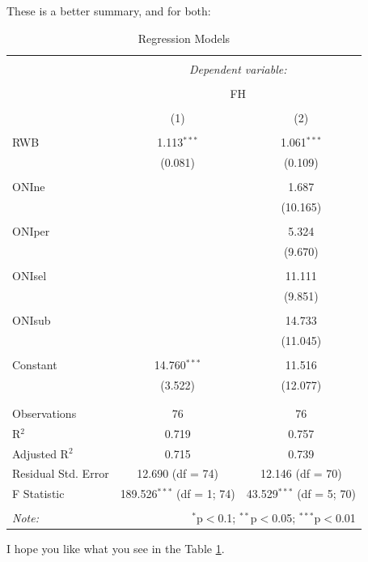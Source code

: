 \documentclass[11pt]{article}
\begin{document}
\clearpage
These is a better summary, and for both:

\begin{table}[!htbp] \centering 
  \caption{Regression Models} 
  \label{regs} 
\begin{tabular}{@{\extracolsep{5pt}}lcc} 
\\[-1.8ex]\hline 
\hline \\[-1.8ex] 
 & \multicolumn{2}{c}{\textit{Dependent variable:}} \\ 
\cline{2-3} 
\\[-1.8ex] & \multicolumn{2}{c}{FH} \\ 
\\[-1.8ex] & (1) & (2)\\ 
\hline \\[-1.8ex] 
 RWB & 1.113$^{***}$ & 1.061$^{***}$ \\ 
  & (0.081) & (0.109) \\ 
  & & \\ 
 ONIne &  & 1.687 \\ 
  &  & (10.165) \\ 
  & & \\ 
 ONIper &  & 5.324 \\ 
  &  & (9.670) \\ 
  & & \\ 
 ONIsel &  & 11.111 \\ 
  &  & (9.851) \\ 
  & & \\ 
 ONIsub &  & 14.733 \\ 
  &  & (11.045) \\ 
  & & \\ 
 Constant & 14.760$^{***}$ & 11.516 \\ 
  & (3.522) & (12.077) \\ 
  & & \\ 
\hline \\[-1.8ex] 
Observations & 76 & 76 \\ 
R$^{2}$ & 0.719 & 0.757 \\ 
Adjusted R$^{2}$ & 0.715 & 0.739 \\ 
Residual Std. Error & 12.690 (df = 74) & 12.146 (df = 70) \\ 
F Statistic & 189.526$^{***}$ (df = 1; 74) & 43.529$^{***}$ (df = 5; 70) \\ 
\hline 
\hline \\[-1.8ex] 
\textit{Note:}  & \multicolumn{2}{r}{$^{*}$p$<$0.1; $^{**}$p$<$0.05; $^{***}$p$<$0.01} \\ 
\end{tabular} 
\end{table} 
I hope you like what you see in the Table \ref{regs}.

\clearpage

%

\renewcommand{\refname}{Bibliography}

\end{document}
